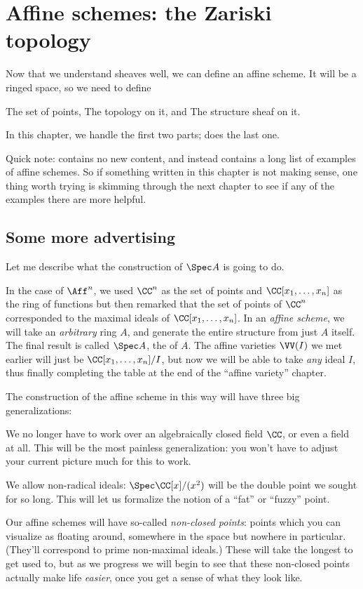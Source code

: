 \chapter{Affine schemes: the Zariski topology}
\label{ch:spec_zariski}
Now that we understand sheaves well,
we can define an affine scheme.
It will be a ringed space, so we need to define
\begin{itemize}
	\ii The set of points,
	\ii The topology on it, and
	\ii The structure sheaf on it.
\end{itemize}
In this chapter, we handle the first two parts;
 does the last one.

Quick note: 
contains no new content, and instead
contains a long list of examples of affine schemes.
So if something written in this chapter is not making sense,
one thing worth trying is skimming through the next chapter
to see if any of the examples there are more helpful.

\section{Some more advertising}
Let me describe what the construction of $\Spec A$ is going to do.

In the case of $\Aff^n$, we used $\CC^n$ as the set of points
and $\CC[x_1, \dots, x_n]$ as the ring of functions
but then remarked that the set of points
of $\CC^n$ corresponded to the maximal ideals of $\CC[x_1, \dots, x_n]$.
In an \emph{affine scheme}, we will take an \emph{arbitrary} ring $A$,
and generate the entire structure from just $A$ itself.
The final result is called $\Spec A$, the  of $A$.
The affine varieties $\VV(I)$ we met earlier will just be
$\CC[x_1, \dots, x_n] / I$, but now we will be able to take
\emph{any} ideal $I$, thus finally completing the table at the end
of the ``affine variety'' chapter.

The construction of the affine scheme in this way
will have three big generalizations:
\begin{enumerate}
	\ii We no longer have to work over an algebraically
	closed field $\CC$, or even a field at all.
	This will be the most painless generalization:
	you won't have to adjust your current picture much for this to work.

	\ii We allow non-radical ideals:
	$\Spec \CC[x] / (x^2)$ will be the double point
	we sought for so long.
	This will let us formalize the notion of a ``fat'' or ``fuzzy'' point.

	\ii Our affine schemes will have so-called \emph{non-closed points}:
	points which you can visualize as floating around,
	somewhere in the space but nowhere in particular.
	(They'll correspond to prime non-maximal ideals.)
	These will take the longest to get used to,
	but as we progress we will begin to see that these non-closed points
	actually make life \emph{easier},
	once you get a sense of what they look like.
\end{enumerate}


